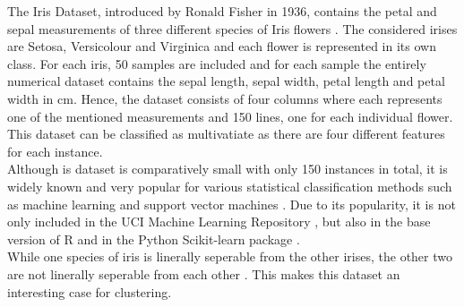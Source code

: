 The Iris Dataset, introduced by Ronald Fisher in 1936, contains the petal and sepal measurements of three different species of Iris flowers \cite{fisher1936use}. The considered irises are Setosa, Versicolour and Virginica and each flower is represented in its own class. For each iris, 50 samples are included and for each sample the entirely numerical dataset contains the sepal length, sepal width, petal length and petal width in cm. Hence, the dataset consists of four columns where each represents one of the mentioned measurements and 150 lines, one for each individual flower. This dataset can be classified as multivatiate as there are four different features for each instance. \\
Although is dataset is comparatively small with only 150 instances in total, it is widely known and very popular for various statistical classification methods such as machine learning and support vector machines \cite{inproceedings}. Due to its popularity, it is not only included in the UCI Machine Learning Repository \cite{Dua2019}, but also in the base version of R \cite{rbase} and in the Python Scikit-learn package \cite{scikitlearn}.\\
While one species of iris is linerally seperable from the other irises, the other two are not linerally seperable from each other \cite{Dua2019}. This makes this dataset an interesting case for clustering.